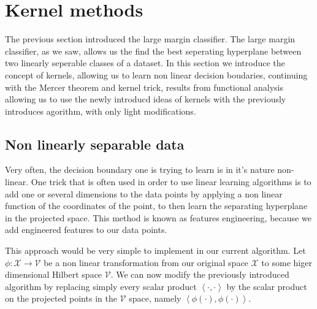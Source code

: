 


\usepackage[latin1]{inputenc}
\usepackage{mathtools}
\usepackage{amssymb}
\usepackage{amsmath}
\usepackage{amsbsy}
\usepackage{mathrsfs}
\usepackage{color}
\usepackage{pgfplots}
\usepackage{tikz}
\usetikzlibrary{calc}
\usepackage{relsize}

\pagestyle{empty}
\hyphenation{}



\section{Kernel methods}

The previous section introduced the large margin classifier. The large margin classifier, as we saw, allows us the find the best seperating hyperplane between two linearly seperable classes of a dataset. In this section we introduce the concept of kernels, allowing us to learn non linear decision boudaries, continuing with the Mercer theorem and kernel trick, results from functional analysis allowing us to use the newly introducd ideas of kernels with the previously introduces agorithm, with only light modifications.

\subsection{Non linearly separable data}

Very often, the decision boundary one is trying to learn is in it's nature non-linear. One trick that is often used in order to use linear learning algorithms is to add one or several dimensions to the data points by applying a non linear function of the coordinates of the point, to then learn the separating hyperplane in the projected space. This method is known as features engineering, because we add engineered features to our data points.


This approach would be very simple to implement in our current algorithm. Let $\phi : \mathcal{X} \rightarrow \mathcal{V}$ be a non linear transformation from our original space $\mathcal{X}$ to some higer dimensional Hilbert space $\mathcal{V}$. We can now modify the previously introduced algorithm by replacing simply every scalar product $\left<\cdot , \cdot\right>$ by the scalar product on the projected points in the $\mathcal{V}$ space, namely $\left<\phi(\cdot), \phi(\cdot)\right>$.


